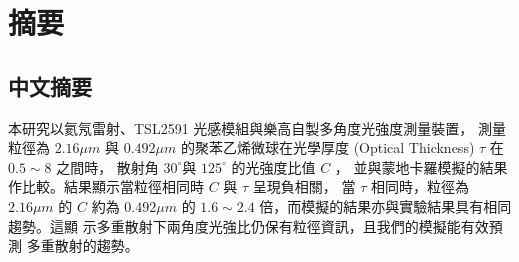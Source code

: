 \section*{摘要}
\subsection*{中文摘要}
本研究以氦氖雷射、TSL2591 光感模組與樂高自製多角度光強度測量裝置，
測量粒徑為 $2.16\mu m$ 與 $0.492\mu m$ 的聚苯乙烯微球在光學厚度
(Optical Thickness) $\tau$ 在 $0.5 \sim 8$ 之間時，
散射角 ${30}^{\circ }$與 ${125}^{\circ }$ 的光強度比值 $ C $ ，
並與蒙地卡羅模擬的結果作比較。結果顯示當粒徑相同時 $C$ 與 $\tau$ 呈現負相關，
當 $\tau$ 相同時，粒徑為 $2.16\mu m$ 的 $C$ 約為 $0.492\mu m$ 
的 $1.6\sim 2.4$ 倍，而模擬的結果亦與實驗結果具有相同趨勢。這顯
示多重散射下兩角度光強比仍保有粒徑資訊，且我們的模擬能有效預測
多重散射的趨勢。
